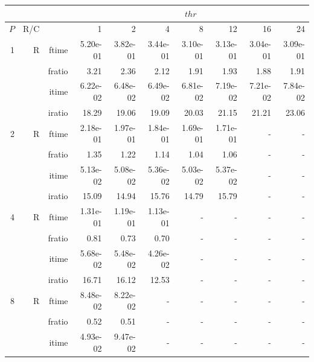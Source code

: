 \documentclass[a4paper]{article}
\begin{document}
\begin{table}[htbp]
\begin{center}
\begin{small}
\begin{tabular}{|r|r|r|r|r|r|r|r|r|r|}
\hline 
     & & & \multicolumn{7}{c|}{$thr$} \\ \hline
    $P$ & R/C &  & 1           & 2    & 4    & 8    & 12   & 16    & 24  \\ \hline\hline
     1 & R & ftime & 5.20e-01 & 3.82e-01 & 3.44e-01 & 3.10e-01 & 3.13e-01 & 3.04e-01 & 3.09e-01 \\   
          &      & fratio & 3.21 & 2.36 & 2.12 & 1.91 & 1.93 & 1.88 & 1.91 \\   
          &      & itime & 6.22e-02 & 6.48e-02 & 6.49e-02 & 6.81e-02 & 7.19e-02 & 7.21e-02 & 7.84e-02 \\   
          &      & iratio & 18.29 & 19.06 & 19.09 & 20.03 & 21.15 & 21.21 & 23.06 \\ \hline 
     2 & R & ftime & 2.18e-01 & 1.97e-01 & 1.84e-01 & 1.69e-01 & 1.71e-01 &     -     &     -     \\   
          &      & fratio & 1.35 & 1.22 & 1.14 & 1.04 & 1.06 &     -     &     -     \\   
          &      & itime & 5.13e-02 & 5.08e-02 & 5.36e-02 & 5.03e-02 & 5.37e-02 &     -     &     -     \\   
          &      & iratio & 15.09 & 14.94 & 15.76 & 14.79 & 15.79 &     -     &     -     \\ \hline 
     4 & R & ftime & 1.31e-01 & 1.19e-01 & 1.13e-01 &     -     &     -     &     -     &     -     \\   
          &      & fratio & 0.81 & 0.73 & 0.70 &     -     &     -     &     -     &     -     \\   
          &      & itime & 5.68e-02 & 5.48e-02 & 4.26e-02 &     -     &     -     &     -     &     -     \\   
          &      & iratio & 16.71 & 16.12 & 12.53 &     -     &     -     &     -     &     -     \\ \hline 
     8 & R & ftime & 8.48e-02 & 8.22e-02 &     -     &     -     &     -     &     -     &     -     \\   
          &      & fratio & 0.52 & 0.51 &     -     &     -     &     -     &     -     &     -     \\   
          &      & itime & 4.93e-02 & 9.47e-02 &     -     &     -     &     -     &     -     &     -     \\   

\end{tabular}
\end{small}
\end{center}
\end{table}
\end{document}
